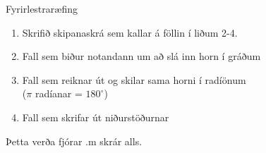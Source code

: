 \documentclass[handout]{beamer}
\begin{document}
\begin{frame}{Fyrirlestraræfing}
  \begin{enumerate}
      \item Skrifið skipanaskrá sem kallar á föllin í liðum 2-4.
      \item Fall sem biður notandann um að slá inn horn í gráðum
      \item Fall sem reiknar út og skilar sama horni í radíönum\\ ($\pi$ radíanar = $180^\circ$)
      \item Fall sem skrifar út niðurstöðurnar
  \end{enumerate}
  Þetta verða fjórar .m skrár alls.
\end{frame}
\end{document}
